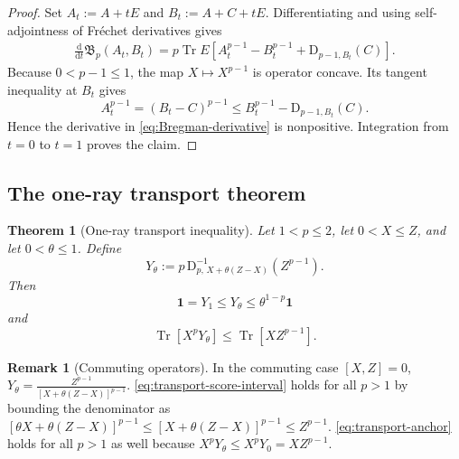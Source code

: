 \documentclass[11pt,reqno]{amsart}
\newtheorem{theorem}{Theorem}[section]
\theoremstyle{definition}
\newtheorem{remark}[remark]{Remark}
\DeclareMathOperator{\Tr}{Tr}
\newcommand{\I}{\mathbf 1}
\newcommand{\dd}{\mathrm d}
\newcommand{\Breg}{\mathfrak{B}}
\begin{document}
\begin{proof}
Set $A_t:=A+tE$ and $B_t:=A+C+tE$.  Differentiating and using
self-adjointness of Fr\'echet derivatives gives
\begin{align}
 \frac{\dd}{\dd t}\Breg_p(A_t,B_t)
 =p\Tr E\!\left[
 A_t^{p-1}-B_t^{p-1}
 +\mathrm D_{p-1,B_t}(C)
 \right].
 \label{eq:Bregman-derivative}
\end{align}
Because $0<p-1\leq1$, the map $X\mapsto X^{p-1}$ is operator concave.  Its
tangent inequality at $B_t$ gives
\[
 A_t^{p-1}
 =(B_t-C)^{p-1}
 \leq
 B_t^{p-1}-\mathrm D_{p-1,B_t}(C).
\]
Hence the derivative in \cref{eq:Bregman-derivative} is nonpositive.
Integration from $t=0$ to $t=1$ proves the claim.
\end{proof}

\subsection{The one-ray transport theorem} \label{sec:Petz_technical}

\begin{theorem}[One-ray transport inequality]\label{thm:one-ray-transport}
Let $1<p\leq2$, let $0<X\leq Z$, and let $0<\theta\leq1$.  Define
\begin{equation}\label{eq:transported-score}
 Y_\theta
 :=p\,\mathrm D_{p,\,X+\theta(Z-X)}^{-1}(Z^{p-1}).
\end{equation}
Then
\begin{equation}\label{eq:transport-score-interval}
 \I= Y_1 \leq Y_\theta\leq\theta^{1-p}\I
\end{equation}
and
\begin{equation}\label{eq:transport-anchor}
 \Tr[X^pY_\theta]\leq\Tr[XZ^{p-1}].
\end{equation}
\end{theorem}

\begin{remark}[Commuting operators] \label{remark:commuting}
	In the commuting case $[X,Z] = 0$, $Y_\theta =  \frac{Z^{p-1}}{[X+\theta(Z-X)]^{p-1}}$.
	\cref{eq:transport-score-interval} holds for all $p>1$ by bounding the denominator as $[\theta X + \theta(Z-X)]^{p-1} \leq [X+\theta(Z-X)]^{p-1} \leq Z^{p-1}$.
	\cref{eq:transport-anchor} holds for all $p>1$ as well 
	because $X^p Y_\theta \leq X^p Y_0 = X Z^{p-1}$.
\end{remark}
\end{document}
